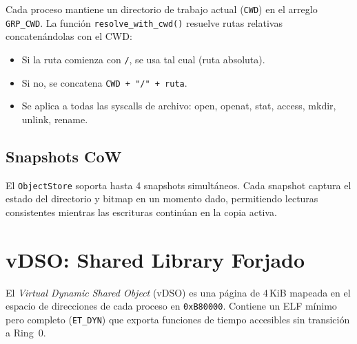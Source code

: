 \documentclass[11pt,twoside,openright]{book}
\theoremstyle{definition}
\theoremstyle{plain}
\theoremstyle{remark}
\begin{document}
Cada proceso mantiene un directorio de trabajo actual (\texttt{CWD}) en el arreglo
\texttt{GRP\_CWD}. La función \texttt{resolve\_with\_cwd()} resuelve rutas relativas
concatenándolas con el CWD:

\begin{itemize}
    \item Si la ruta comienza con \texttt{/}, se usa tal cual (ruta absoluta).
    \item Si no, se concatena \texttt{CWD + "/" + ruta}.
    \item Se aplica a todas las syscalls de archivo: open, openat, stat, access,
          mkdir, unlink, rename.
\end{itemize}

\subsection{Snapshots CoW}

El \texttt{ObjectStore} soporta hasta 4 snapshots simultáneos. Cada snapshot
captura el estado del directorio y bitmap en un momento dado, permitiendo
lecturas consistentes mientras las escrituras continúan en la copia activa.

\section{vDSO: Shared Library Forjado}
\label{sec:vdso}

El \emph{Virtual Dynamic Shared Object} (vDSO) es una página de 4\,KiB mapeada
en el espacio de direcciones de cada proceso en \texttt{0xB80000}. Contiene un
ELF mínimo pero completo (\texttt{ET\_DYN}) que exporta funciones de tiempo
accesibles sin transición a Ring~0.
\end{document}
